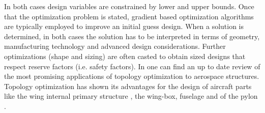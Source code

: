 In both cases design variables are constrained by lower and upper bounds. Once that the optimization problem is stated, gradient based optimization algorithms are typically employed to improve an initial guess design. When a solution is determined, in both cases the solution has to be interpreted in terms of geometry, manufacturing technology and advanced design considerations. Further optimizations (shape and sizing) are often casted to obtain sized designs that respect reserve factors (i.e. safety factors). In \cite{zhu2016topology} one can find an up to date review of the most promising applications of topology optimization to aerospace structures. Topology optimization has shown its advantages for the design of aircraft parts like the wing internal primary structure \cite{eves2009topology,aage2017giga}, the wing-box, fuselage \cite{niemann2013use,singh2016topology} and of the pylon \cite{remouchamps2011application,xue2012structural}.  

